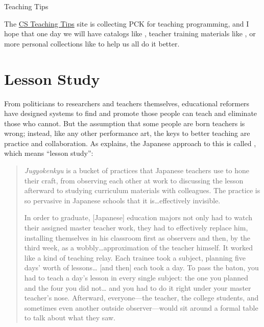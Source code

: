 \begin{callout}{Teaching Tips}

  The \href{http://csteachingtips.org/}{CS Teaching Tips} site is
  collecting PCK for teaching programming, and I hope that one day we
  will have catalogs like \cite{Ojos2015}, teacher training materials
  like \cite{Hazz2014,Guzd2015a,Sent2018}, or more personal
  collections like \cite{Gelm2002} to help us all do it better.

\end{callout}

\section{Lesson Study}\label{s:performance-jugyokenkyu}

From politicians to researchers and teachers themselves, educational
reformers have designed systems to find and promote those people can
teach and eliminate those who cannot. But the assumption that some
people are born teachers is wrong; instead, like any other performance
art, the keys to better teaching are practice and collaboration.  As
\cite{Gree2014} explains, the Japanese approach to this is called
, which means ``lesson study'':

\begin{quote}

  \emph{Jugyokenkyu} is a bucket of practices that Japanese teachers
  use to hone their craft, from observing each other at work to
  discussing the lesson afterward to studying curriculum materials
  with colleagues. The practice is so pervasive in Japanese schools
  that it is{\ldots}effectively invisible.

  In order to graduate, {[}Japanese{]} education majors not only had
  to watch their assigned master teacher work, they had to effectively
  replace him, installing themselves in his classroom first as
  observers and then, by the third week, as a
  wobbly{\ldots}approximation of the teacher himself. It worked like a
  kind of teaching relay. Each trainee took a subject, planning five
  days' worth of lessons{\ldots} {[}and then{]} each took a day. To
  pass the baton, you had to teach a day's lesson in every single
  subject: the one you planned and the four you did not{\ldots} and
  you had to do it right under your master teacher's nose.  Afterward,
  everyone---the teacher, the college students, and sometimes even
  another outside observer---would sit around a formal table to talk
  about what they saw.

\end{quote}

